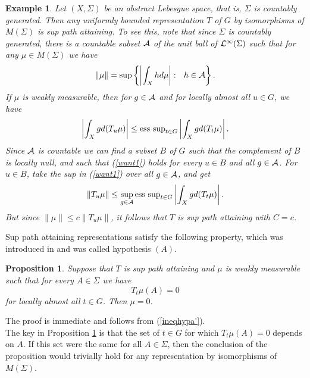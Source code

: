 \documentclass[12pt]{article}
\newtheorem{ex}[defin]{Example}
\newtheorem{prop}[defin]{Proposition}
\begin{document}
\begin{ex}
{\rm
Let $(X,\Sigma)$ be an abstract Lebesgue 
space, that is, $\Sigma$ is countably generated.  
Then 
any uniformly bounded representation $T$ of $G$ 
by isomorphisms of $M(\Sigma)$ is sup path attaining.  
To see this, note that since $\Sigma$ is countably 
generated, there is a countable subset ${\cal A}$ 
of the unit ball of ${\cal L}^\infty(\Sigma)$ such that for any 
$\mu\in M(\Sigma)$ 
we have 
$$
\|\mu\| =\sup\left\{
\left| \int_X h d \mu\right| :\ \ h\in 
{\cal A}
\right\} .
$$
If $\mu$ is weakly measurable, then
for $g\in {\cal A}$ and for locally almost all $u\in G$, we have
\begin{equation}
\left|
\int_X g d (T_u \mu)
\right|
\leq {\rm ess\ sup}_{t\in G}
\left|
\int_X
g d (T_t \mu)
\right|.
\label{want1}
\end{equation}
Since ${\cal A}$ is countable we can find a subset $B$ 
of $G$ such that the complement of $B$ is locally null, 
and such that (\ref{want1}) holds for every $u\in B$ 
and all $g\in {\cal A}$.  For $u\in B$, 
take the sup in (\ref{want1}) over all $g\in {\cal A}$, and get
$$\| T_u \mu\| \leq 
\sup_{g\in {\cal A}}
{\rm ess\ sup}_{t\in G}
\left|
\int_X
g d (T_t \mu)
\right|.
$$
But since $\|\mu\|\leq c \| T_u \mu\|$, it follows that 
$T$ is sup path attaining with $C=c$.}
\label{exhypa3}
\end{ex}

Sup path attaining representations satisfy the
following property, which was introduced in \cite{ams2} and was
called hypothesis $(A)$. 
\begin{prop}
Suppose that $T$ is sup path attaining 
and $\mu$ is weakly measurable such that for 
every $A\in \Sigma$ we have
$$T_t\mu(A)=0$$
for locally almost all $t\in G$.  Then $\mu=0$.
\label{weakhypa}
\end{prop}
The proof is immediate and follows from 
(\ref{ineqhypa'}).\\

The key in Proposition \ref{weakhypa}
is that the set of $t\in G$ 
for which $T_t\mu(A)=0$ depends on $A$. 
If this set were the same for all
$A\in \Sigma$, then the conclusion of the
proposition would trivially hold for
any representation by isomorphisms of $M(\Sigma)$. 
\end{document}
